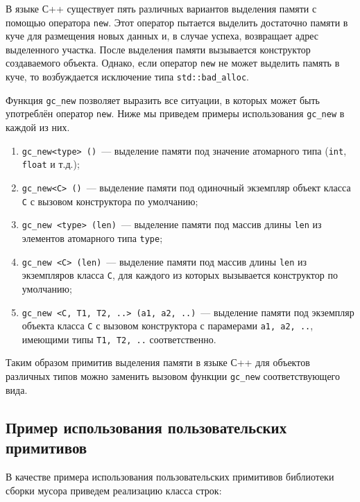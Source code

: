 В языке С++ существует пять различных вариантов выделения памяти с помощью оператора \lstinline{new}. 
Этот оператор пытается выделить достаточно памяти в куче для размещения новых данных и, в случае успеха, возвращает 
адрес выделенного участка. После выделения памяти вызывается конструктор создаваемого объекта. Однако, если оператор
\lstinline{new} не может выделить память в куче, то возбуждается исключение типа \lstinline{std::bad_alloc}. 

Функция \lstinline{gc_new} позволяет выразить все ситуации, в которых может быть употреблён оператор \lstinline{new}.
Ниже мы приведем примеры использования \lstinline{gc_new} в каждой из них.

\begin {enumerate}
\item \lstinline{gc_new<type> ()}~--- выделение памяти под значение атомарного типа (\lstinline{int}, \lstinline{float} и т.д.); 
\item \lstinline{gc_new<C> ()}~--- выделение памяти под одиночный экземпляр объект класса \lstinline{C} с вызовом конструктора по
умолчанию;
\item \lstinline{gc_new <type> (len)}~--- выделение памяти под массив длины \lstinline{len} из элементов атомарного типа \lstinline{type};
\item \lstinline{gc_new <C> (len)}~--- выделение памяти под массив длины \lstinline{len} из экземпляров класса \lstinline{C}, для каждого из
которых вызывается конструктор по умолчанию;
\item \lstinline{gc_new <C, T1, T2, ..> (a1, a2, ..)}~--- выделение памяти под экземпляр объекта класса \lstinline{C} с вызовом
конструктора с парамерами \lstinline{a1, a2, ..}, имеющими типы \lstinline{T1, T2, ..} соответственно.
\end {enumerate}

Таким образом примитив выделения памяти в языке С++ для объектов различных типов можно заменить вызовом функции \lstinline{gc_new} 
соответствующего вида.

\subsection{Пример использования пользовательских\\
примитивов}

В качестве примера использования пользовательских примитивов библиотеки сборки мусора приведем 
реализацию класса строк:

